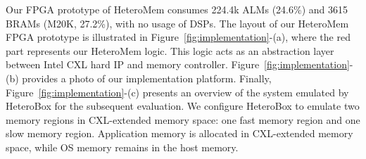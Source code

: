Our FPGA prototype of HeteroMem consumes 224.4k ALMs (24.6\%) and 3615 BRAMs (M20K, 27.2\%), with no usage of DSPs. The layout of our HeteroMem FPGA prototype is illustrated in Figure~\ref{fig:implementation}-(a), where the red part represents our HeteroMem logic. This logic acts as an abstraction layer between Intel CXL hard IP and memory controller. Figure~\ref{fig:implementation}-(b) provides a photo of our implementation platform. Finally, Figure~\ref{fig:implementation}-(c) presents an overview of the system emulated by HeteroBox for the subsequent evaluation. 
We configure HeteroBox to emulate two memory regions in CXL-extended memory space: one fast memory region and one slow memory region. Application memory is allocated in CXL-extended memory space, while OS memory remains in the host memory.




